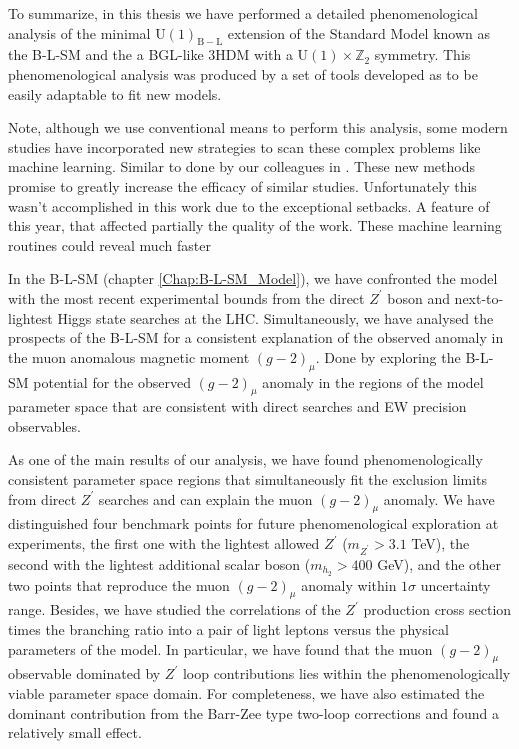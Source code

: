 \documentclass[10pt]{book}
\newcommand{\U}[1]{\mathrm{U}(1)_{\mathrm{#1}}}
\renewcommand{\(}{\left(}
\renewcommand{\)}{\right)}
\renewcommand{\[}{\left[}
\renewcommand{\]}{\right]}
\begin{document}
%  
%
%
%

To summarize, in this thesis we have performed a detailed phenomenological analysis of the minimal $\U{B-L}$ extension of the Standard Model known as the B-L-SM and the a BGL-like 3HDM with a $\mathrm{U(1)} \times \mathbb{Z}_2$ symmetry. 
%
This phenomenological analysis was produced by a set of tools developed as to be easily adaptable to fit new models. 

Note, although we use conventional means to perform this analysis, some modern studies have incorporated new strategies to scan these complex problems like machine learning. Similar to done by our colleagues in \cite{freitas2020phenomenology}. These new methods promise to greatly increase the efficacy of similar studies. 
%
Unfortunately this wasn't accomplished in this work due to the exceptional setbacks. A feature of this year, that affected partially the quality of the work. 
%
These machine learning routines could reveal much faster


In the B-L-SM (chapter \ref{Chap:B-L-SM_Model}), we have confronted the model with the most recent experimental bounds from the direct $Z^\prime$ boson and next-to-lightest Higgs state searches at the LHC.
%
Simultaneously, we have analysed the prospects of the B-L-SM for a consistent explanation of the observed anomaly in the muon anomalous magnetic moment $(g-2)_{\mu}$. 
%
Done by exploring the B-L-SM potential for the observed $(g-2)_{\mu}$ anomaly in the regions of the model parameter space that are consistent with direct searches and EW precision observables.

As one of the main results of our analysis, we have found phenomenologically consistent parameter space regions that simultaneously fit the exclusion limits from direct $Z^\prime$ searches and can explain the muon $(g-2)_{\mu}$ anomaly. 
%
We have distinguished four benchmark points for future phenomenological exploration at experiments, the first one with the lightest allowed $Z^\prime$ ($m_{Z^\prime}>3.1$ TeV), the second with the lightest additional scalar boson ($m_{h_2}>400$ GeV), and the other two points that reproduce the muon $(g-2)_{\mu}$ anomaly within $1\sigma$ uncertainty range. 
%
Besides, we have studied the correlations of the $Z^\prime$ production cross section times the branching ratio into a pair of light leptons versus the physical parameters of the model.
%
In particular, we have found that the muon $(g-2)_{\mu}$ observable dominated by $Z^\prime$ loop contributions lies within the phenomenologically viable parameter space domain. 
%
For completeness, we have also estimated the dominant contribution from the Barr-Zee type two-loop corrections and found a relatively small effect.
\end{document}
